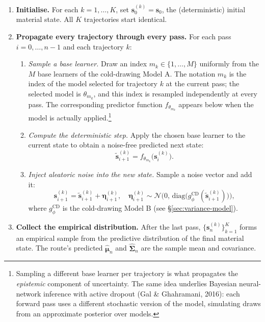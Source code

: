 \documentclass[11pt,a4paper]{article}
\begin{document}
\begin{enumerate}
    \item \textbf{Initialise.} For each $k = 1, \ldots, K$, set $\bm s_0^{(k)} = \bm s_0$, the (deterministic) initial material state. All $K$ trajectories start identical.

    \item \textbf{Propagate every trajectory through every pass.} For each pass $i = 0, \ldots, n-1$ and each trajectory $k$:
    \begin{enumerate}
        \item \emph{Sample a base learner.} Draw an index $m_k \in \{1, \ldots, M\}$ uniformly from the $M$ base learners of the cold-drawing Model A. The notation $m_k$ is the index of the model selected for trajectory $k$ at the current pass; the selected model is $\theta_{m_k}$, and this index is resampled independently at every pass. The corresponding predictor function $f_{\theta_{m_k}}$ appears below when the model is actually applied.\footnote{Sampling a different base learner per trajectory is what propagates the \emph{epistemic} component of uncertainty. The same idea underlies Bayesian neural-network inference with active dropout (Gal \& Ghahramani, 2016): each forward pass uses a different stochastic version of the model, simulating draws from an approximate posterior over models.}

        \item \emph{Compute the deterministic step.} Apply the chosen base learner to the current state to obtain a noise-free predicted next state:
        \[
        \tilde{\bm s}_{i+1}^{(k)} = f_{\theta_{m_k}}\!\big(\bm s_i^{(k)}\big).
        \]

        \item \emph{Inject aleatoric noise into the new state.} Sample a noise vector and add it:
        \[
        \bm s_{i+1}^{(k)} = \tilde{\bm s}_{i+1}^{(k)} + \bm\eta_{i+1}^{(k)},
        \quad
        \bm\eta_{i+1}^{(k)} \sim \mathcal{N}\!\Big(0,\, \mathrm{diag}\big(g_\phi^{\text{CD}}(\tilde{\bm s}_{i+1}^{(k)})\big)\Big),
        \]
        where $g_\phi^{\text{CD}}$ is the cold-drawing Model B (see §\ref{sec:variance-model}).
    \end{enumerate}

    \item \textbf{Collect the empirical distribution.} After the last pass, $\{\bm s_n^{(k)}\}_{k=1}^K$ forms an empirical sample from the predictive distribution of the final material state. The route's predicted $\hat{\bm\mu}_n$ and $\hat{\bm\Sigma}_n$ are the sample mean and covariance.
\end{enumerate}
\end{document}
